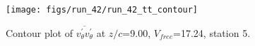 \begin{figure}[H]
\centering
\texttt{[image: figs/run\_42/run\_42\_tt\_contour]}
\caption{Contour plot of $\overline{v_{\theta}^{\prime} v_{\theta}^{\prime}}$ at $z/c$=9.00, $V_{free}$=17.24, station 5.}
\label{fig:run_42_tt_contour}
\end{figure}


